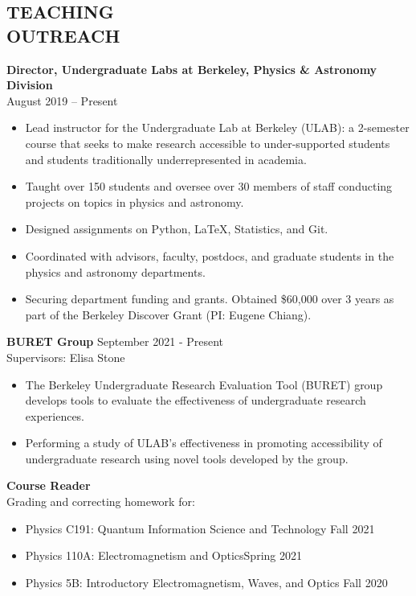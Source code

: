 \documentclass[margin, 10pt]{res} %
\begin{document}
\begin{resume}
\section{TEACHING\\OUTREACH}

{\textbf{Director, Undergraduate Labs at Berkeley, Physics \& Astronomy Division}}\\
\null \hfill August 2019 – Present
\begin{itemize}
\item Lead instructor for the Undergraduate Lab at Berkeley (ULAB): a 2-semester course that seeks to make research accessible to under-supported students and students traditionally underrepresented in academia.
\item Taught over 150 students and oversee over 30 members of staff conducting projects on topics in physics and astronomy.
\item Designed assignments on Python, LaTeX, Statistics, and Git.
\item Coordinated with advisors, faculty, postdocs, and graduate students in the physics and astronomy departments.
\item Securing department funding and grants. Obtained \$60,000 over 3 years as part of the Berkeley Discover Grant (PI: Eugene Chiang). 
\end{itemize}

{\textbf{BURET Group}} \hfill September 2021 - Present\\
Supervisors: Elisa Stone
\begin{itemize}
    \item The Berkeley Undergraduate Research Evaluation Tool (BURET) group develops tools to evaluate the effectiveness of undergraduate research experiences.
    \item Performing a study of ULAB's effectiveness in promoting accessibility of undergraduate research using novel tools developed by the group.
\end{itemize}

{\textbf{Course Reader}} \\
Grading and correcting homework for:
\begin{itemize}
    \item Physics C191: Quantum Information Science and Technology \hfill Fall 2021
    \item Physics 110A: Electromagnetism and Optics\hfill Spring 2021
    \item Physics 5B: Introductory Electromagnetism, Waves, and Optics \hfill Fall 2020
\end{itemize}


\end{resume}
\end{document}
